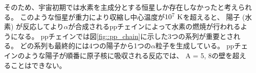 \documentclass[../master]{subfiles}
\begin{document}
そのため、宇宙初期では水素を主成分とする恒星しか存在しなかったと考えられる。
このような恒星が重力により収縮し中心温度が$10^7~{\rm K}$を超えると、
陽子 (水素) が反応してより$\alpha$が合成されるppチェインによって水素の燃焼が行われるようになる。
ppチェインでは図\ref{fig::pp_chain}に示した3つの系列が重要とされる。
どの系列も最終的には4つの陽子から1つの$\alpha$粒子を生成している。
ppチェインのような陽子が順番に原子核に吸収される反応では、
A = 5, 8の壁を超えることはできない。
\end{document}
